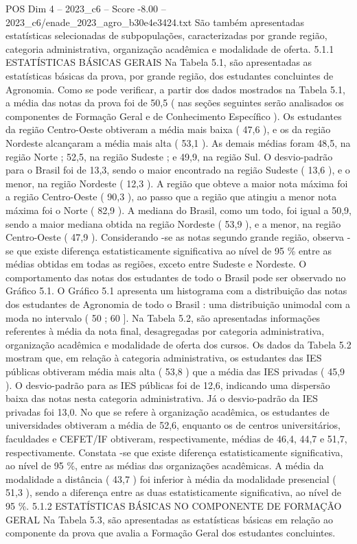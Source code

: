 \begin{textsample}{POS Dim 4 – 2023\_c6 – Score -8.00 – 2023\_c6/enade\_2023\_agro\_b30e4e3424.txt}
São também apresentadas estatísticas selecionadas de subpopulações, caracterizadas por grande região, categoria administrativa, organização acadêmica e modalidade de oferta. 5.1.1 ESTATÍSTICAS BÁSICAS GERAIS Na Tabela 5.1, são apresentadas as estatísticas básicas da prova, por grande região, dos estudantes concluintes de Agronomia.
Como se pode verificar, a partir dos dados mostrados na Tabela 5.1, a média das notas da prova foi de 50,5 ( nas seções seguintes serão analisados os componentes de Formação Geral e de Conhecimento Específico ).
Os estudantes da região Centro-Oeste obtiveram a média mais baixa ( 47,6 ), e os da região Nordeste alcançaram a média mais alta ( 53,1 ).
As demais médias foram 48,5, na região Norte ; 52,5, na região Sudeste ; e 49,9, na região Sul.
O desvio-padrão para o Brasil foi de 13,3, sendo o maior encontrado na região Sudeste ( 13,6 ), e o menor, na região Nordeste ( 12,3 ).
A região que obteve a maior nota máxima foi a região Centro-Oeste ( 90,3 ), ao passo que a região que atingiu a menor nota máxima foi o Norte ( 82,9 ).
A mediana do Brasil, como um todo, foi igual a 50,9, sendo a maior mediana obtida na região Nordeste ( 53,9 ), e a menor, na região Centro-Oeste ( 47,9 ).
Considerando -se as notas segundo grande região, observa -se que existe diferença estatisticamente significativa ao nível de 95 \% entre as médias obtidas em todas as regiões, exceto entre Sudeste e Nordeste.
O comportamento das notas dos estudantes de todo o Brasil pode ser observado no Gráfico 5.1.
O Gráfico 5.1 apresenta um histograma com a distribuição das notas dos estudantes de Agronomia de todo o Brasil : uma distribuição unimodal com a moda no intervalo ( 50 ; 60 ].
Na Tabela 5.2, são apresentadas informações referentes à média da nota final, desagregadas por categoria administrativa, organização acadêmica e modalidade de oferta dos cursos.
Os dados da Tabela 5.2 mostram que, em relação à categoria administrativa, os estudantes das IES públicas obtiveram média mais alta ( 53,8 ) que a média das IES privadas ( 45,9 ).
O desvio-padrão para as IES públicas foi de 12,6, indicando uma dispersão baixa das notas nesta categoria administrativa.
Já o desvio-padrão da IES privadas foi 13,0.
No que se refere à organização acadêmica, os estudantes de universidades obtiveram a média de 52,6, enquanto os de centros universitários, faculdades e CEFET/IF obtiveram, respectivamente, médias de 46,4, 44,7 e 51,7, respectivamente.
Constata -se que existe diferença estatisticamente significativa, ao nível de 95 \%, entre as médias das organizações acadêmicas.
A média da modalidade a distância ( 43,7 ) foi inferior à média da modalidade presencial ( 51,3 ), sendo a diferença entre as duas estatisticamente significativa, ao nível de 95 \%. 5.1.2 ESTATÍSTICAS BÁSICAS NO COMPONENTE DE FORMAÇÃO GERAL Na Tabela 5.3, são apresentadas as estatísticas básicas em relação ao componente da prova que avalia a Formação Geral dos estudantes concluintes.

\end{textsample}
